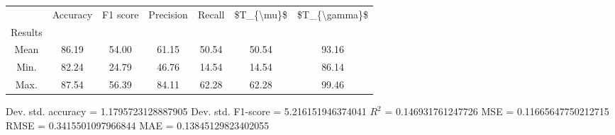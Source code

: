 \begin{tabular}{|c|c|c|c|c|c|c|}
\toprule
{} &  Accuracy &  F1 score &  Precision &  Recall &  \$T\_\{\textbackslash mu\}\$ &  \$T\_\{\textbackslash gamma\}\$ \\
Results &           &           &            &         &            &               \\
\hline
Mean    &     86.19 &     54.00 &      61.15 &   50.54 &      50.54 &         93.16 \\
Min.    &     82.24 &     24.79 &      46.76 &   14.54 &      14.54 &         86.14 \\
Max.    &     87.54 &     56.39 &      84.11 &   62.28 &      62.28 &         99.46 \\
\bottomrule
\end{tabular}

 Dev. std. accuracy = 1.1795723128887905
 Dev. std. F1-score = 5.216151946374041
 $R^2$ = 0.146931761247726
 MSE = 0.11665647750212715
 RMSE = 0.3415501097966844
 MAE = 0.13845129823402055